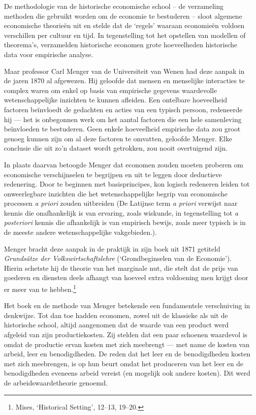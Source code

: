 \documentclass[smalldemyvopaper,11pt,twoside,onecolumn,openright,extrafontsizes,hidelinks]{memoir}
\begin{document}
De methodologie van de historische economische school -- de verzameling
methoden die gebruikt worden om de economie te bestuderen -- sloot
algemene economische theorieën uit en stelde dat de `regels' waaraan
economieën voldoen verschillen per cultuur en tijd. In tegenstelling tot
het opstellen van modellen of theorema's, verzamelden historische
economen grote hoeveelheden historische data voor empirische analyse.

Maar professor Carl Menger van de Universiteit van Wenen had deze aanpak
in de jaren 1870 al afgewezen. Hij geloofde dat mensen en menselijke
interacties te complex waren om enkel op basis van empirische gegevens
waardevolle wetenschappelijke inzichten te kunnen afleiden. Een
ontelbare hoeveelheid factoren beïnvloedt de gedachten en acties van een
typisch persoon, redeneerde hij --- het is onbegonnen werk om het aantal
factoren die een hele samenleving beïnvloeden te bestuderen. Geen enkele
hoeveelheid empirische data zou groot genoeg kunnen zijn om al deze
factoren te omvatten, geloofde Menger. Elke conclusie die uit zo'n
dataset wordt getrokken, zou nooit overtuigend zijn.

In plaats daarvan betoogde Menger dat economen zouden moeten proberen om
economische verschijnselen te begrijpen en uit te leggen door deductieve
redenering. Door te beginnen met basisprincipes, kon logisch redeneren
leiden tot onweerlegbare inzichten die het wetenschappelijke begrip van
economische processen \emph{a priori} zouden uitbreiden (De Latijnse
term \emph{a priori} verwijst naar kennis die onafhankelijk is van
ervaring, zoals wiskunde, in tegenstelling tot \emph{a posteriori}
kennis die afhankelijk is van empirisch bewijs, zoals meer typisch is in
de meeste andere wetenschappelijke vakgebieden.).

Menger bracht deze aanpak in de praktijk in zijn boek uit 1871 getiteld
\emph{Grundsätze der Volkswirtschaftslehre} (`Grondbeginselen van de
Economie'). Hierin schetste hij de theorie van het marginale nut, die
stelt dat de prijs van goederen en diensten deels afhangt van hoeveel
extra voldoening men krijgt door er meer van te hebben.\footnote{\hspace{0pt}Mises,
  `Historical Setting', 12--13, 19--20.}

Het boek en de methode van Menger betekende een fundamentele
verschuiving in denkwijze. Tot dan toe hadden economen, zowel uit de
klassieke als uit de historische school, altijd aangenomen dat de waarde
van een product werd afgeleid van zijn productiekosten. Zij stelden dat
een paar schoenen waardevol is omdat de productie ervan kosten met zich
meebrengt --- met name de kosten van arbeid, leer en benodigdheden. De
reden dat het leer en de benodigdheden kosten met zich meebrengen, is op
hun beurt omdat het produceren van het leer en de benodigdheden eveneens
arbeid vereist (en mogelijk ook andere kosten). Dit werd de
arbeidswaardetheorie genoemd.
\end{document}
